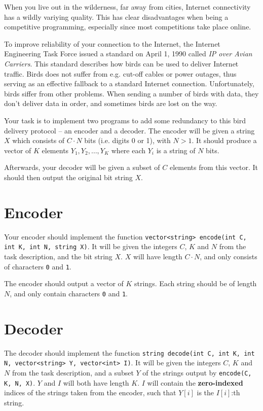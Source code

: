 \def\version{1}
When you live out in the wilderness, far away from cities, Internet connectivity has a wildly variying quality.
This has clear disadvantages when being a competitive programming, especially since most competitions take place online.

To improve reliability of your connection to the Internet, the Internet Engineering Task Force issued a standard on April 1, 1990 called \emph{IP over Avian Carriers}.
This standard describes how birds can be used to deliver Internet traffic.
Birds does not suffer from e.g. cut-off cables or power outages, thus serving as an effective fallback to a standard Internet connection.
Unfortunately, birds siffer from other problems.
When sending a number of birds with data, they don't deliver data in order, and sometimes birds are lost on the way.

Your task is to implement two programs to add some redundancy to this bird delivery protocol -- an encoder and a decoder.
The encoder will be given a string $X$ which consists of $C \cdot N$ bits (i.e. digits 0 or 1), with $N > 1$.
It should produce a vector of $K$ elements $Y_1, Y_2, \dots, Y_K$ where each $Y_i$ is a string of $N$ bits.

Afterwards, your decoder will be given a subset of $C$ elements from this vector.
It should then output the original bit string $X$.

\section*{Encoder}
Your encoder should implement the function \texttt{vector<string> encode(int C, int K, int N, string X)}.
It will be given the integers $C$, $K$ and $N$ from the task description, and the bit string $X$.
$X$ will have length $C \cdot N$, and only consists of characters \texttt{0} and \texttt{1}.

The encoder should output a vector of $K$ strings.
Each string should be of length $N$, and only contain characters \texttt{0} and \texttt{1}.

\section*{Decoder}
The decoder should implement the function \texttt{string decode(int C, int K, int N, vector<string> Y, vector<int> I)}.
It will be given the integers $C$, $K$ and $N$ from the task description, and a subset $Y$ of the strings output by \texttt{encode(C, K, N, X)}.
$Y$ and $I$ will both have length $K$.
$I$ will contain the \textbf{zero-indexed} indices of the strings taken from the encoder, such that $Y[i]$ is the $I[i]$:th string.

